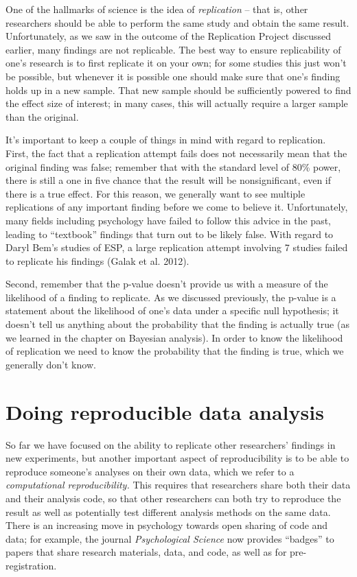 \documentclass[]{book}
\theoremstyle{definition}
\theoremstyle{definition}
\theoremstyle{definition}
\theoremstyle{remark}
\begin{document}
One of the hallmarks of science is the idea of \emph{replication} --
that is, other researchers should be able to perform the same study and
obtain the same result. Unfortunately, as we saw in the outcome of the
Replication Project discussed earlier, many findings are not replicable.
The best way to ensure replicability of one's research is to first
replicate it on your own; for some studies this just won't be possible,
but whenever it is possible one should make sure that one's finding
holds up in a new sample. That new sample should be sufficiently powered
to find the effect size of interest; in many cases, this will actually
require a larger sample than the original.

It's important to keep a couple of things in mind with regard to
replication. First, the fact that a replication attempt fails does not
necessarily mean that the original finding was false; remember that with
the standard level of 80\% power, there is still a one in five chance
that the result will be nonsignificant, even if there is a true effect.
For this reason, we generally want to see multiple replications of any
important finding before we come to believe it. Unfortunately, many
fields including psychology have failed to follow this advice in the
past, leading to ``textbook'' findings that turn out to be likely false.
With regard to Daryl Bem's studies of ESP, a large replication attempt
involving 7 studies failed to replicate his findings (Galak et al.
2012).

Second, remember that the p-value doesn't provide us with a measure of
the likelihood of a finding to replicate. As we discussed previously,
the p-value is a statement about the likelihood of one's data under a
specific null hypothesis; it doesn't tell us anything about the
probability that the finding is actually true (as we learned in the
chapter on Bayesian analysis). In order to know the likelihood of
replication we need to know the probability that the finding is true,
which we generally don't know.

\section{Doing reproducible data
analysis}\label{doing-reproducible-data-analysis}

So far we have focused on the ability to replicate other researchers'
findings in new experiments, but another important aspect of
reproducibility is to be able to reproduce someone's analyses on their
own data, which we refer to a \emph{computational reproducibility.} This
requires that researchers share both their data and their analysis code,
so that other researchers can both try to reproduce the result as well
as potentially test different analysis methods on the same data. There
is an increasing move in psychology towards open sharing of code and
data; for example, the journal \emph{Psychological Science} now provides
``badges'' to papers that share research materials, data, and code, as
well as for pre-registration.
\end{document}

